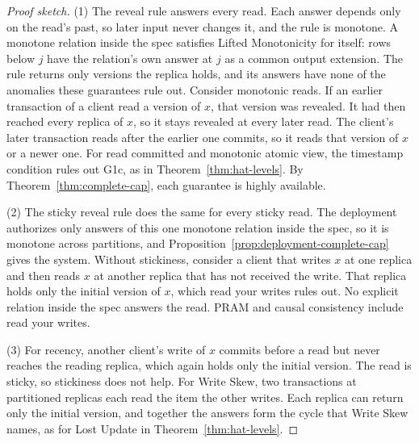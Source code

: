 \documentclass[sigconf]{cidr-2027}
\theoremstyle{remark}
\newcommand{\outnoun}{output extension\xspace}%
\begin{document}
\begin{proof}[Proof sketch]
(1) The reveal rule answers every read. Each answer depends only on the read's
past, so later input never changes it, and the rule is monotone. A monotone
relation inside the spec satisfies Lifted Monotonicity for itself: rows below
$j$ have the relation's own answer at $j$ as a common \outnoun. The rule
returns only versions the replica holds, and its answers have none of the
anomalies these guarantees rule out. Consider monotonic reads. If an earlier
transaction of a client read a version of $x$, that version was revealed. It
had then reached every replica of $x$, so it stays revealed at every later
read. The client's later transaction reads after the earlier one commits, so
it reads that version of $x$ or a newer one. For read committed and monotonic atomic view, the timestamp condition rules
out G1c, as in Theorem~\ref{thm:hat-levels}. By
Theorem~\ref{thm:complete-cap}, each guarantee is highly available.

(2) The sticky reveal rule does the same for every sticky read. The deployment
authorizes only answers of this one monotone relation inside the spec, so it
is monotone across partitions, and Proposition~\ref{prop:deployment-complete-cap}
gives the system. Without stickiness, consider a client that writes $x$ at
one replica and then reads $x$ at another replica that has not received the
write. That replica holds only the initial version of $x$, which read your
writes rules out. No explicit relation inside the spec answers the read. PRAM and causal consistency include read your writes.

(3) For recency, another client's write of $x$ commits before a read but never
reaches the reading replica, which again holds only the initial version. The
read is sticky, so stickiness does not help. For Write Skew, two transactions
at partitioned replicas each read the item the other writes. Each replica can
return only the initial version, and together the answers form the cycle that
Write Skew names, as for Lost Update in Theorem~\ref{thm:hat-levels}.
\end{proof}
\end{document}
